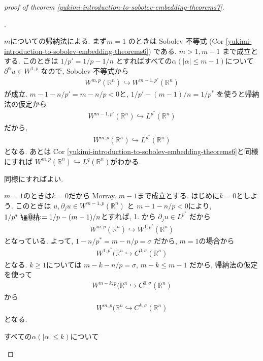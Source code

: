 \documentclass[openany, a4paper, oneside]{jsbook}
\makeatletter
\newcounter{enum2}
\renewenvironment{enumerate}{%
\begin{list}%
{%
\arabic{enum2}.\ \,%
}%
{%
\usecounter{enum2}
\setlength{\itemindent}{0pt}%
\setlength{\leftmargin}{15pt}%
\setlength{\rightmargin}{0pt}%
\setlength{\labelsep}{0pt}%
\setlength{\labelwidth}{6pt}%
\setlength{\itemsep}{0pt}%
\setlength{\parsep}{0pt}%
\setlength{\listparindent}{0pt}%
}
}{%
\end{list}%
}
\newcommand*{\defeq}{\mathrel{\rlap{%
\raisebox{0.3ex}{$\m@th\cdot$}}%
\raisebox{-0.3ex}{$\m@th\cdot$}}%
=}
\theoremstyle{break}
\theoremstyle{breakdefn}
\newcommand{\bbR}{\mathbb{R}}
\makeatother
\begin{document}
\begin{proof}[proof of theorem \ref{yukimi-introduction-to-sobolev-embedding-theorems7}]
\begin{enumerate}
\item $m$についての帰納法による.
   まず$m = 1$ のときは Sobolev 不等式 (Cor \ref{yukimi-introduction-to-sobolev-embedding-theorems6}) である.
   $m > 1, m-1$ まで成立とする.
   このときは $1/{p'} = 1/p - 1/n$ とすればすべての$\alpha (|\alpha| \le m-1)$について
   $\partial^{\alpha} u \in W^{1, p}$ なので, Sobolev 不等式から
   \begin{align}
    W^{m, p}(\bbR^n) \hookrightarrow W^{m-1, p'}(\bbR^n)
   \end{align}
   が成立.
   $m-1 - n/{p'} = m - n/p < 0$と, $1/{p'} - (m-1)/n = 1/{p^*}$ を使うと帰納法の仮定から
   \begin{align}
    W^{m-1, p'}(\bbR^n) \hookrightarrow L^{p^*}(\bbR^n)
   \end{align}
   だから,
   \begin{align}
    W^{m, p}(\bbR^n) \hookrightarrow L^{p^*}(\bbR^n)
   \end{align}
   となる.
   あとは Cor \ref{yukimi-introduction-to-sobolev-embedding-theorems6}と同様にすれば
   $W^{m, p}(\bbR^n) \hookrightarrow L^{q}(\bbR^n)$がわかる.
\item 同様にすればよい.
\item $m = 1$のときは$k = 0$だから Morray.
   $m-1$まで成立とする.
   はじめに$k = 0$としよう.
   このときは $u, \partial_j u \in W^{m-1, p}(\bbR^n)$ と $m-1 - n/p < 0$により,
   $1/{p^*} \defeq 1/p - (m-1)/n$とすれば, 1. から
   $\partial_j u \in L^{p^*}$ だから
   \begin{align}
    W^{m, p}(\bbR^n) \hookrightarrow W^{1, p^*}(\bbR^n)
   \end{align}
   となっている.
   よって, $1 - n/{p^*} = m - n/p = \sigma$ だから, $m = 1$の場合から
   \begin{align}
    W^{1, p^*}(\bbR^n \hookrightarrow C^{0, \sigma}(\bbR^n)
   \end{align}
   となる.
   $k \ge 1$については $m - k - n/p = \sigma$, $m - k \le m -1$ だから,
   帰納法の仮定を使って
   \begin{align}
    W^{m - k, p}(\bbR^n \hookrightarrow C^{0, \sigma}(\bbR^n)
   \end{align}
   から
   \begin{align}
    W^{m, p}(\bbR^n \hookrightarrow C^{k, \sigma}(\bbR^n)
   \end{align}
   となる.
\item すべての$\alpha (|\alpha| \le k)$について

\end{enumerate}
\end{proof}
\end{document}
